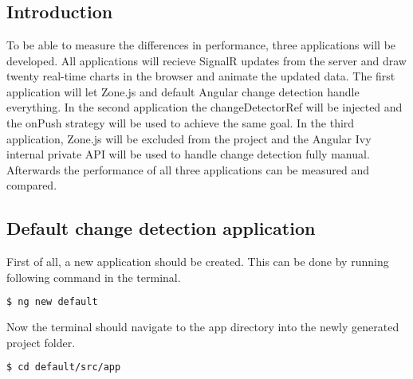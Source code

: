 
\chapter{}
\label{ch:methodologie}


\section{Introduction}
To be able to measure the differences in performance, three applications will be developed. All applications will recieve SignalR updates from the server and draw twenty real-time charts in the browser and animate the updated data. The first application will let Zone.js and default Angular change detection handle everything. In the second application the changeDetectorRef will be injected and the onPush strategy will be used to achieve the same goal. In the third application, Zone.js will be excluded from the project and the Angular Ivy internal private API will be used to handle change detection fully manual. Afterwards the performance of all three applications can be measured and compared.

\section{Default change detection application}
First of all, a new application should be created. This can be done by running following command in the terminal.
\begin{lstlisting}[language=bash]
$ ng new default
\end{lstlisting}

Now the terminal should navigate to the app directory into the newly generated project folder.

\begin{lstlisting}[language=bash]
	$ cd default/src/app
\end{lstlisting}

